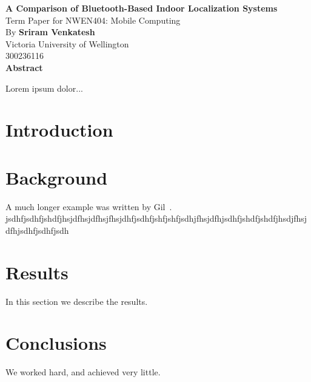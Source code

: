 \documentclass[12pt]{article}
\begin{document}
\begin{titlepage}

\begin{center}
\Huge
\textbf{A Comparison of Bluetooth-Based Indoor Localization Systems} \\
\small
Term Paper for NWEN404: Mobile Computing\\
\large    
\vspace{0.4cm}
By \textbf{Sriram Venkatesh}\\
Victoria University of Wellington\\
300236116 \\

\vspace{0.9cm}
\textbf{Abstract}
\end{center}
Lorem ipsum dolor...


\end{titlepage}
\doublespacing

\section{Introduction}



\section{Background}
A much longer example was written by Gil~\cite{Gil:02}. jsdhfjsdhfjshdfjhsjdfhsjdfhsjfhsjdhfjsdhfjshfjshfjsdhjfhsjdfhjsdhfjshdfjshdfjhsdjfhsjdfhjsdhfjsdhfjsdh

\section{Results}\label{results}
In this section we describe the results.

\section{Conclusions}\label{conclusions}
We worked hard, and achieved very little.



\nocite{*}
\end{document}
